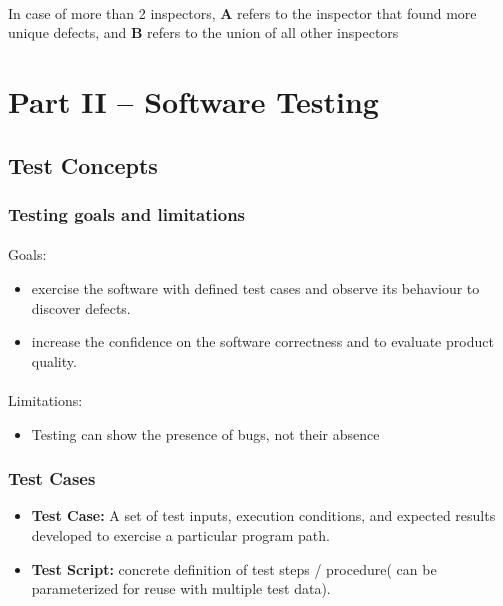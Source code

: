\documentclass[../ESOF_notes.tex]{subfiles}
\begin{document}
        \paragraph{}
        In case of more than 2 inspectors, \textbf{A} refers to the inspector that found
        more unique defects, and \textbf{B} refers to the union of all other inspectors


\section{Part II – Software Testing}
    \subsection{Test Concepts}
        \subsubsection{Testing goals and limitations}
            \paragraph{}
            Goals:
            \begin{itemize}
                \item exercise the software with defined test cases 
                and observe its behaviour to discover defects.
                \item  increase the confidence on the software 
                correctness and to evaluate product quality.
            \end{itemize}
            \paragraph{}
            Limitations:
            \begin{itemize}
                \item Testing can show the presence of bugs, not their absence
            \end{itemize}
        \subsubsection{Test Cases}
            \begin{itemize}
                \item \textbf{Test Case:} A set of test inputs, 
                execution conditions, and expected results developed
                to exercise a particular program path.
                \item \textbf{Test Script:} concrete definition of test 
                steps / procedure( can be parameterized for reuse with 
                multiple test data).
            \end{itemize}
\end{document}
